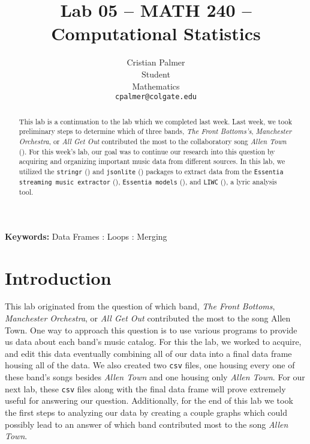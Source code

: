 \documentclass{article}\usepackage[]{graphicx}\usepackage[]{xcolor}
\begin{document}
\vspace{-1in}
\title{Lab 05 -- MATH 240 -- Computational Statistics}

\author{
  Cristian Palmer \\
  Student  \\
  Mathematics  \\
  {\tt cpalmer@colgate.edu}
}

\date{}

\maketitle

\begin{multicols}{2}
\begin{abstract}
This lab is a continuation to the lab which we completed last week. Last week, we took preliminary steps to determine which of three bands, \textit{The Front Bottoms's}, \textit{Manchester Orchestra}, or \textit{All Get Out} contributed the most to the collaboratory song \textit{Allen Town} (\cite{Song}). For this week's lab, our goal was to continue our research into this question by acquiring and organizing important music data from different sources. In this lab, we utilized the \texttt{stringr} (\cite{stringr}) and \texttt{jsonlite} (\cite{jsonlite}) packages to extract data from the \texttt{Essentia streaming music extractor} (\cite{Essentia}), \texttt{Essentia models} (\cite{Essentia2}), and  \texttt{LIWC} (\cite{LIWC}), a lyric analysis tool. 
\end{abstract}

\noindent \textbf{Keywords:} Data Frames : Loops : Merging
\section{Introduction}
This lab originated from the question of which band, \textit{The Front Bottoms}, \textit{Manchester Orchestra}, or \textit{All Get Out} contributed the most to the song Allen Town. One way to approach this question is to use various programs to provide us data about each band's music catalog. For this the lab, we worked to acquire, and edit this data eventually combining all of our data into a final data frame housing all of the data. We also created two \texttt{csv} files, one housing every one of these band's songs besides \textit{Allen Town} and one housing only \textit{Allen Town}. For our next lab, these \texttt{csv} files along with the final data frame will prove extremely useful for answering our question. Additionally, for the end of this lab we took the first steps to analyzing our data by creating a couple graphs which could possibly lead to an answer of which band contributed most to the song \textit{Allen Town}.

\end{multicols}
\end{document}
